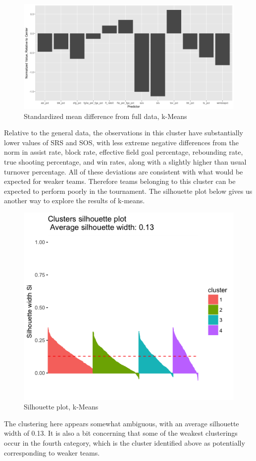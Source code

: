 \documentclass[10pt,a4paper, hidelinks]{article} %
\begin{document}
\begin{figure}[H]
	\centering
	\includegraphics[width=0.7\linewidth]{../fig/weakclusterk}
		\caption{Standardized mean difference from full data, k-Means}
\end{figure}

Relative to the general data, the observations in this cluster have substantially lower values of SRS and SOS, with less extreme negative differences from the norm in assist rate, block rate, effective field goal percentage, rebounding rate, true shooting percentage, and win rates, along with a slightly higher than usual turnover percentage. All of these deviations are consistent with what would be expected for weaker teams. Therefore teams belonging to this cluster can be expected to perform poorly in the tournament.  The silhouette plot below gives us another way to explore the results of k-means.

\begin{figure}[H]
	\centering
	\includegraphics[width=0.7\linewidth]{../fig/kmeansil}
		\caption{Silhouette plot, k-Means}
\end{figure}

The clustering here appears somewhat ambiguous, with an average silhouette width of 0.13.  It is also a bit concerning that some of the weakest clusterings occur in the fourth category, which is the cluster identified above as potentially corresponding to weaker teams.
\end{document}
